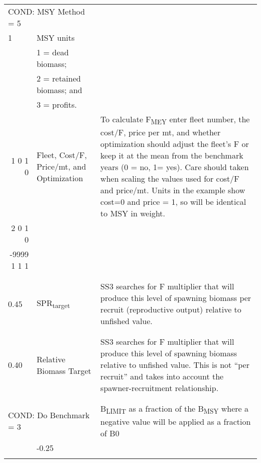 \begin{landscape}
{\begin{longtable}{p{3.2cm} p{7cm} p{10.8cm}}
 \multicolumn{2}{l}{COND: MSY Method = 5} &  \Tstrut\\
 1 & MSY units &  \\
   & 1 = dead biomass; & \\
   & 2 = retained biomass; and & \\
   & 3 = profits. &  \\

 \multicolumn{1}{r}{1 0 1 0 } & Fleet, Cost/F, Price/mt, and Optimization & \multirow{1}{1cm}[-0.1cm]{\parbox{11cm}{To calculate F\textsubscript{MEY} enter fleet number, the cost/F, price per mt, and whether optimization should adjust the fleet's F or keep it at the mean from the benchmark years (0 = no, 1= yes). Care should taken when scaling the values used for cost/F and price/mt. Units in the example show cost=0 and price = 1, so will be identical to MSY in weight.}}  \\
 \multicolumn{1}{r}{2 0 1 0 } & &   \\
 \multicolumn{1}{r}{-9999 1 1 1 } &  & \\
 & & \\
 & & \Bstrut\\


 \hline
 0.45 & SPR\textsubscript{target} &  \multirow{1}{1cm}[-0.25cm]{\parbox{11cm }{ SS3 searches for F multiplier that will produce this level of spawning biomass per recruit (reproductive output) relative to unfished value.}} \Tstrut\\
      & & \\
      & & \\
 
 \hline
 0.40 & Relative Biomass Target & \multirow{1}{1cm}[-0.25cm]{\parbox{11cm }{ SS3 searches for F multiplier that will produce this level of spawning biomass relative to unfished value.  This is not “per recruit” and takes into account the spawner-recruitment relationship.}} \Tstrut\\
      & & \Bstrut\\
      & & \Bstrut\\
  
 \hline 
 \multicolumn{2}{l}{COND: Do Benchmark = 3} &  \multirow{1}{1cm}[-0.1cm]{\parbox{11cm}{B\textsubscript{LIMIT} as a fraction of the B\textsubscript{MSY} where a negative value will be applied as a fraction of B0}}\Tstrut\\
     & -0.25 &  \\
     &       & \Bstrut\\
  

\end{longtable}}
\end{landscape}
